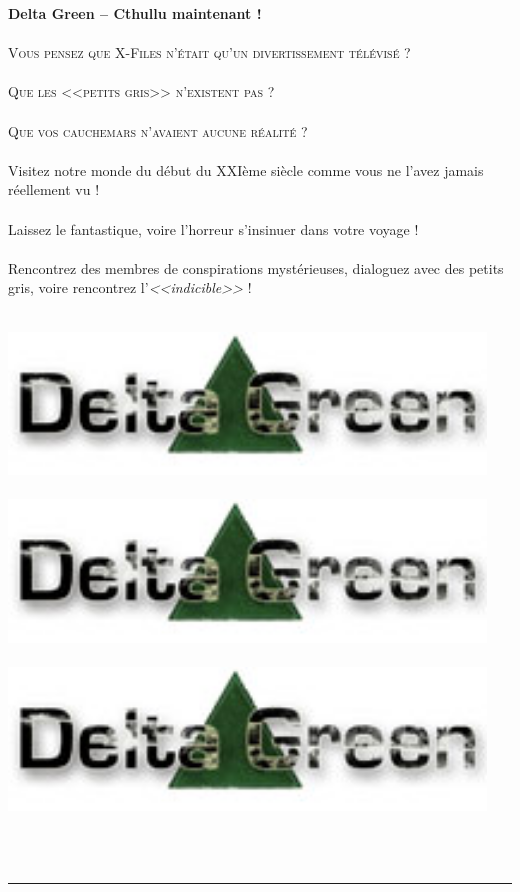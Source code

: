 \documentclass[40pt,twoside,a4paper]{article}
\begin{document}
\begin{minipage}[ht]{0.65\textwidth}
	\textbf{\huge Delta Green -- Cthullu maintenant !} ~\\~\\
	\textsc{\LARGE Vous pensez que X-Files n'{\'e}tait qu'un divertissement t{\'e}l{\'e}vis{\'e} ?}~\\~\\
	\textsc{\LARGE Que les <<petits gris>>  n'existent pas ?}~\\~\\
	\textsc{\LARGE Que vos cauchemars n'avaient aucune r{\'e}alit{\'e} ?}~\\~\\
	
	{\Large
		Visitez notre monde du d{\'e}but du XXI{\`e}me si{\`e}cle comme vous ne l'avez jamais r{\'e}ellement vu !~\\~\\
		Laissez le fantastique, voire l'horreur s'insinuer dans votre voyage !~\\~\\
		Rencontrez des membres de conspirations myst{\'e}rieuses, dialoguez avec des petits gris, voire rencontrez l'\emph{<<indicible>>} !~\\~\\
	}

\end{minipage} \hfill \begin{minipage}[ht]{0.30\textwidth}
	\includegraphics[width=0.95\textwidth]{img/logo_DG.jpg} ~\\~\\
	\includegraphics[width=0.95\textwidth]{img/logo_DG.jpg} ~\\~\\
	\includegraphics[width=0.95\textwidth]{img/logo_DG.jpg} ~\\~\\
\end{minipage} ~\\

\hrule

~\\
\end{document}
